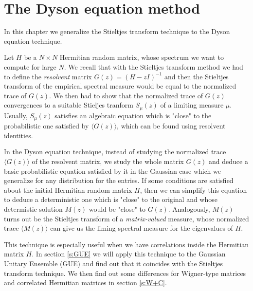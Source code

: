\documentclass[11pt, a4paper, oneside]{book}
\numberwithin{equation}{chapter}
\begin{document}
 \chapter{The Dyson equation method}

 In this chapter we generalize the Stieltjes transform technique to the Dyson equation technique.

 Let $H$ be a $N \times N$ Hermitian random matrix, whose spectrum we want to compute for large $N$. We recall that with the Stieltjes transform method we had to define the \textit{resolvent} matrix $G(z) = (H - zI)^{-1}$ and then the Stieltjes transform of the empirical spectral measure would be equal to the normalized trace of $G(z).$ We then had to show that the normalized trace of $G(z)$ convergences to a suitable Stieljes tranform $S_{\mu}(z)$ of a limiting measure $\mu$. Usually, $S_{\mu}(z)$ satisfies an algebraic equation which is "close" to the probabilistic one satisfied by $\langle G(z) \rangle$, which can be found using resolvent identities.
 
 In the Dyson equation technique, instead of studying the normalized trace $\langle G(z) \rangle$ of the resolvent matrix, we study the whole matrix $G(z)$ and deduce a basic probabilistic equation satisfied by it in the Gaussian case which we generalize for any distribution for the entries. If some conditions are satisfied about the initial Hermitian random matrix $H$, then we can simplify this equation to deduce a deterministic one which is "close" to the original and whose determistic solution $M(z)$ would be "close" to $G(z).$ Analogously, $M(z)$ turns out be the Stieltjes transform of a \textit{matrix-valued} measure, whose normalized trace $\langle M(z) \rangle$ can give us the liming spectral measure for the eigenvalues of $H$.

\pagebreak

 This technique is especially useful when we have correlations inside the Hermitian matrix $H$. In section \ref{s:GUE} we will apply this technique to the Gaussian Unitary Ensemble (GUE) and find out that it coincides with the Stieltjes transform technique. We then find out some differences for Wigner-type matrices and correlated Hermitian matrices in section \ref{s:W+C}.
\end{document}
